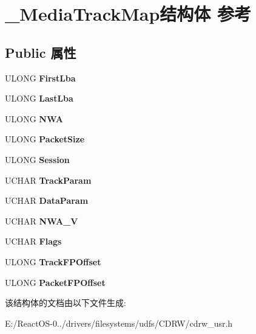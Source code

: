 \hypertarget{struct___media_track_map}{}\section{\+\_\+\+Media\+Track\+Map结构体 参考}
\label{struct___media_track_map}
\subsection*{Public 属性}
\begin{DoxyCompactItemize}
\item 
\mbox{\label{struct___media_track_map_a8c08080c0c08164cfe3ed31b65955ce2}} 
U\+L\+O\+NG {\bfseries First\+Lba}
\item 
\mbox{\label{struct___media_track_map_aff9d5d4da64921160efe4e8a617e317b}} 
U\+L\+O\+NG {\bfseries Last\+Lba}
\item 
\mbox{\label{struct___media_track_map_a703c0e3ae75acdd3caa2e0b62d582489}} 
U\+L\+O\+NG {\bfseries N\+WA}
\item 
\mbox{\label{struct___media_track_map_ac294399fb955921c514bced75d87a469}} 
U\+L\+O\+NG {\bfseries Packet\+Size}
\item 
\mbox{\label{struct___media_track_map_ab58958e44b739f5d839e1a62718c56a8}} 
U\+L\+O\+NG {\bfseries Session}
\item 
\mbox{\label{struct___media_track_map_a34ecba4efe2d1966a0d93e89e37bf90f}} 
U\+C\+H\+AR {\bfseries Track\+Param}
\item 
\mbox{\label{struct___media_track_map_a74c6356360ab96a48fd234741b3f816d}} 
U\+C\+H\+AR {\bfseries Data\+Param}
\item 
\mbox{\label{struct___media_track_map_ad00f350eb08ebcc37c7ace4ee5066716}} 
U\+C\+H\+AR {\bfseries N\+W\+A\+\_\+V}
\item 
\mbox{\label{struct___media_track_map_a9a2351c1e3e4ab243913a351aaa561e1}} 
U\+C\+H\+AR {\bfseries Flags}
\item 
\mbox{\label{struct___media_track_map_a7584f1ae826065900ea0b66f77470cb2}} 
U\+L\+O\+NG {\bfseries Track\+F\+P\+Offset}
\item 
\mbox{\label{struct___media_track_map_ace7809000b88d35157d47058afe59aa9}} 
U\+L\+O\+NG {\bfseries Packet\+F\+P\+Offset}
\end{DoxyCompactItemize}


该结构体的文档由以下文件生成\+:\begin{DoxyCompactItemize}
\item 
E\+:/\+React\+O\+S-\/0../drivers/filesystems/udfs/\+C\+D\+R\+W/cdrw\+\_\+usr.\+h\end{DoxyCompactItemize}
